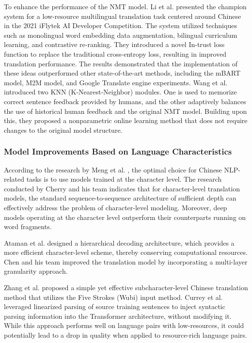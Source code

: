 \documentclass[acmsmall]{acmart}
\begin{document}
To enhance the performance of the NMT model. \color{green} Li et al. \cite{DBLP:journals/corr/abs-2204-04344} presented the champion system for a low-resource multilingual translation task centered around Chinese in the 2021 iFlytek AI Developer Competition. The system utilized techniques such as monolingual word embedding data augmentation, bilingual curriculum learning, and contrastive re-ranking. They introduced a novel In-trust loss function to replace the traditional cross-entropy loss, resulting in improved translation performance. The results demonstrated that the implementation of these ideas outperformed other state-of-the-art methods, including the mBART model, M2M model, and Google Translate engine experiments. \color{black}Wang et al. \cite{n4-32} introduced two KNN (K-Nearest-Neighbor) modules. One is used to memorize correct sentence feedback provided by humans, and the other adaptively balances the use of historical human feedback and the original NMT model. Building upon this, they proposed a nonparametric online learning method that does not require changes to the original model structure.

\subsubsection{Model Improvements Based on Language Characteristics}

According to the research by Meng et al. \cite{n4-33}, the optimal choice for Chinese NLP-related tasks is to use models trained at the character level. The research conducted by Cherry and his team \cite{n4-34} indicates that for character-level translation models, the standard sequence-to-sequence architecture of sufficient depth can effectively address the problem of character-level modeling. Moreover, deep models operating at the character level outperform their counterparts running on word fragments. 

Ataman et al. \cite{n4-35} designed a hierarchical decoding architecture, which provides a more efficient character-level scheme, thereby conserving computational resources. 
Chen and his team \cite{n4-36} improved the translation model by incorporating a multi-layer granularity approach. 

Zhang et al. \cite{n4-37} proposed a simple yet effective subcharacter-level Chinese translation method that utilizes the Five Strokes (Wubi) input method. 
Currey et al. \cite{n4-38} leveraged linearized parsing of source training sentences to inject syntactic parsing information into the Transformer architecture, without modifying it. While this approach performs well on language pairs with low-resources, it could potentially lead to a drop in quality when applied to resource-rich language pairs. 
\end{document}
